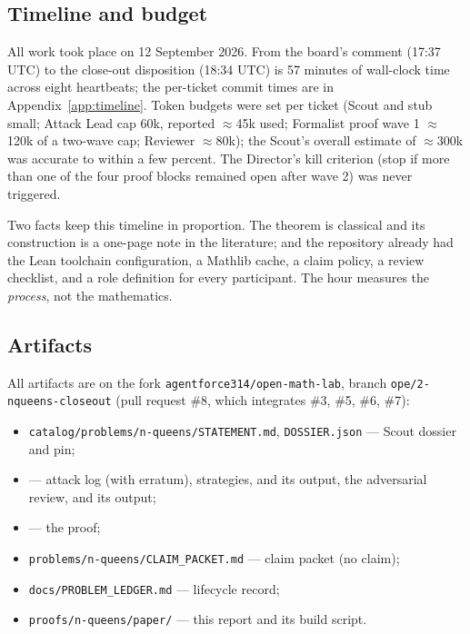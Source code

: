 \documentclass[11pt,a4paper]{article}
\theoremstyle{definition}
\theoremstyle{remark}
\newcommand{\Repo}{\texttt{agentforce314/open-math-lab}}
\begin{document}
\subsection{Timeline and budget}

All work took place on 12 September 2026. From the board's comment (17:37 UTC) to the
close-out disposition (18:34 UTC) is 57 minutes of wall-clock time across eight
heartbeats; the per-ticket commit times are in Appendix~\ref{app:timeline}. Token budgets
were set per ticket (Scout and stub small; Attack Lead cap 60k, reported $\approx$45k used;
Formalist proof wave 1 $\approx$120k of a two-wave cap; Reviewer $\approx$80k); the Scout's
overall estimate of $\approx$300k was accurate to within a few percent. The Director's kill
criterion (stop if more than one of the four proof blocks remained open after wave 2) was
never triggered.

Two facts keep this timeline in proportion. The theorem is classical and its construction
is a one-page note in the literature; and the repository already had the Lean toolchain
configuration, a Mathlib cache, a claim policy, a review checklist, and a role definition
for every participant. The hour measures the \emph{process}, not the mathematics.

\subsection{Artifacts}

All artifacts are on the fork \Repo, branch \texttt{ope/2-nqueens-closeout}
(pull request \#8, which integrates \#3, \#5, \#6, \#7):
\begin{itemize}[nosep]
\item \texttt{catalog/problems/n-queens/STATEMENT.md}, \texttt{DOSSIER.json} --- Scout dossier and pin;
\item {} --- attack log (with erratum), strategies,
 and its output, the adversarial review, 
and its output;
\item {} --- the proof;
\item \texttt{problems/n-queens/CLAIM\_PACKET.md} --- claim packet (no claim);
\item \texttt{docs/PROBLEM\_LEDGER.md} --- lifecycle record;
\item \texttt{proofs/n-queens/paper/} --- this report and its build script.
\end{itemize}
\end{document}

